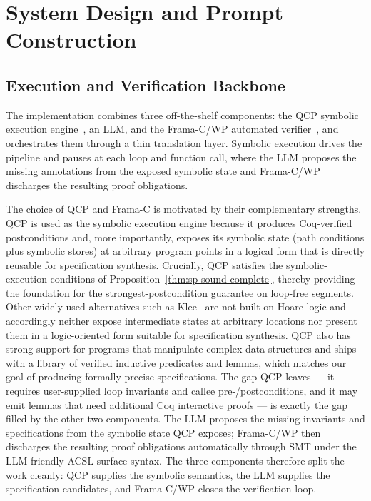 \section{System Design and Prompt Construction}
\label{sec:impl}

\subsection{Execution and Verification Backbone}

The implementation combines three off-the-shelf components: the QCP symbolic execution engine~\cite{wu2025qcppracticalseparationlogicbased,vst-a}, an LLM, and the Frama-C/WP automated verifier~\cite{cuoq2012frama}, and orchestrates them through a thin translation layer. Symbolic execution drives the pipeline and pauses at each loop and function call, where the LLM proposes the missing annotations from the exposed symbolic state and Frama-C/WP discharges the resulting proof obligations.


The choice of QCP and Frama-C is motivated by their complementary strengths. QCP is used as the symbolic execution engine because it produces Coq-verified postconditions and, more importantly, exposes its symbolic state (path conditions plus symbolic stores) at arbitrary program points in a logical form that is directly reusable for specification synthesis. Crucially, QCP satisfies the symbolic-execution conditions of Proposition~\ref{thm:sp-sound-complete}, thereby providing the foundation for the strongest-postcondition guarantee on loop-free segments. Other widely used alternatives such as Klee~\cite{DBLP:conf/osdi/CadarDE08} are not built on Hoare logic and accordingly neither expose intermediate states at arbitrary locations nor present them in a logic-oriented form suitable for specification synthesis. QCP also has strong support for programs that manipulate complex data structures and ships with a library of verified inductive predicates and lemmas, which matches our goal of producing formally precise specifications. The gap QCP leaves --- it requires user-supplied loop invariants and callee pre-/postconditions, and it may emit lemmas that need additional Coq interactive proofs --- is exactly the gap filled by the other two components. The LLM proposes the missing invariants and specifications from the symbolic state QCP exposes; Frama-C/WP then discharges the resulting proof obligations automatically through SMT under the LLM-friendly ACSL surface syntax. The three components therefore split the work cleanly: QCP supplies the symbolic semantics, the LLM supplies the specification candidates, and Frama-C/WP closes the verification loop.

